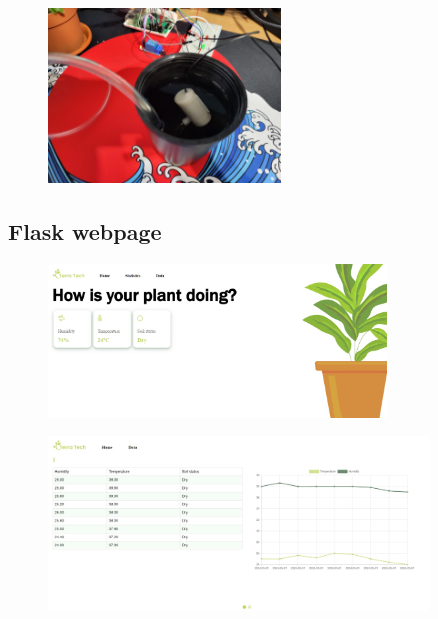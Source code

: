 \documentclass[12pt]{article}
\begin{document}
\newpage

\begin{figure}[ht]
    \centering
    \includegraphics[width=0.55\textwidth]{images/image18.jpeg}
\end{figure} 

\subsection{Flask webpage}

\begin{figure}[ht]
    \centering
    \includegraphics[width=0.8\textwidth]{images/image19.jpeg}
\end{figure}

\begin{figure}[ht]
    \centering
    \includegraphics[width=0.9\textwidth]{images/image20.jpeg}
\end{figure}

\newpage
\end{document}
